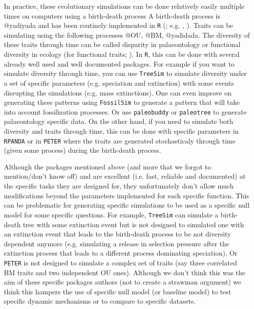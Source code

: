 \documentclass[12pt,letterpaper]{article}
\begin{document}
In practice, these evolutionary simulations can be done relatively easily multiple times on computers using a birth-death process \cite{feller1939birthdeath,stadler2010birthdeath,diversitree}
A birth-death process is @yadiyada and has been routinely implemented in \texttt{R} (\citealt{R}; e.g. \citealt{ape}, \citealt{diversitree}).
Traits can be simulating using the following processes @OU, @BM, @yadidada.
The diversity of these traits through time can be called disparity in palaeontology \cite{guillerme2020disparities} or functional diversity in ecology (for functional traits; \citealt{mammola2021concepts}).
In \texttt{R}, this can be done with several already well used and well documented packages.
For example if you want to simulate diversity through time, you can use \texttt{TreeSim} \citep{treesim} to simulate diversity under a set of specific parameters (e.g. speciation and extinction) with some events disrupting the simulations (e.g. mass extinctions).
One can even improve on generating these patterns using \texttt{FossilSim} \citep{fossilsim} to generate a pattern that will take into account fossilization processes.
Or use \texttt{paleobuddy} \citep{paleobuddy} or \texttt{paleotree} \citep{paleotree} to generate palaeontology specific data.
On the other hand, if you need to simulate both diversity and traits through time, this can be done with specific parameters in \texttt{RPANDA} \citep{rpanda} or in \texttt{PETER} \citep{puttick2020complex} where the traits are generated stochasticaly through time (given some process) during the birth-death process.

Although the packages mentioned above (and more that we forgot to mention/don't know off) and are excellent (i.e. fast, reliable and documented) at the specific tasks they are designed for, they unfortunately don't allow much modifications beyond the parameters implemented for each specific function.
This can be problematic for generating specific simulations to be used as a specific null model for some specific questions.
For example, \texttt{TreeSim} can simulate a birth-death tree with some extinction event but is not designed to simulated one with an extinction event that leads to the birth-death process to be not diversity dependent anymore (e.g. simulating a release in selection pressure after the extinction process that leads to a different process dominating speciation).
Or \texttt{PETER} is not designed to simulate a complex set of traits (say three correlated BM traits and two independent OU ones).
Although we don't think this was the aim of these specific packages authors (not to create a strawman argument) we think this hampers the use of specific null model (or baseline model) to test specific dynamic mechanisms or to compare to specific datasets. 
\end{document}
